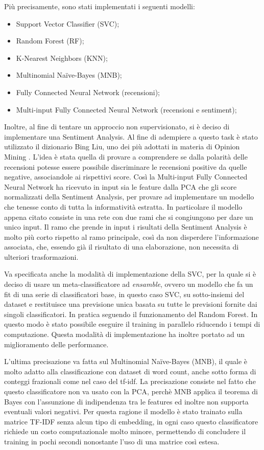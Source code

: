 \documentclass[fleqn,10pt]{SelfArx} %
\begin{document}
Più precisamente, sono stati implementati i seguenti modelli:

\begin{itemize}
\item Support Vector Classifier (SVC);
\item Random Forest (RF);
\item K-Nearest Neighbors (KNN);
\item Multinomial Naïve-Bayes (MNB);
\item Fully Connected Neural Network (recensioni);
\item Multi-input Fully Connected Neural Network (recensioni e sentiment);

\end{itemize}
Inoltre, al fine di tentare un approccio non supervisionato, si è deciso di implementare una Sentiment Analysis. Al fine di adempiere a questo task è stato utilizzato il dizionario Bing Liu, uno dei più adottati in materia di Opinion Mining \cite{article2}. 
L'idea è stata quella di provare a comprendere se dalla polarità delle recensioni potesse essere possibile discriminare le recensioni positive da quelle negative, associandole ai rispettivi score. Così la Multi-input Fully Connected Neural Network ha ricevuto in input sia le feature dalla PCA che gli score normalizzati della Sentiment Analysis, per provare ad implementare un modello che tenesse conto di tutta la informatività estratta. In particolare il modello appena citato consiste in una rete con due rami che si congiungono per dare un unico input. Il ramo che prende in input i risultati della Sentiment Analysis è molto più corto rispetto al ramo principale, così da non disperdere l'informazione associata, che, essendo già il risultato di una elaborazione, non necessita di ulteriori trasformazioni.

Va specificata anche la modalità di implementazione della SVC, per la quale si è deciso di usare un meta-classificatore ad \textit{ensamble}, ovvero un modello che fa un fit di una serie di classificatori base, in questo caso SVC, su sotto-insiemi del dataset e restituisce una previsione unica basata su tutte le previsioni fornite dai singoli classificatori. In pratica seguendo il funzionamento del Random Forest. In questo modo è stato possibile eseguire il training in parallelo riducendo i tempi di computazione. Questa modalità di implementazione ha inoltre portato ad un miglioramento delle performance.

L'ultima precisazione va fatta sul Multinomial Naïve-Bayes (MNB), il quale è molto adatto alla classificazione con dataset di word count, anche sotto forma di conteggi frazionali come nel caso del tf-idf. La precisazione consiste nel fatto che questo classificatore non va usato con la PCA, perchè  MNB applica il teorema di Bayes con l'assunzione di indipendenza tra le features ed inoltre non supporta eventuali valori negativi. Per questa ragione il modello è stato trainato sulla matrice TF-IDF senza alcun tipo di embedding, in ogni caso questo classificatore richiede un costo computazionale molto minore, permettendo di concludere il training in pochi secondi nonostante l'uso di una matrice così estesa.
\end{document}
